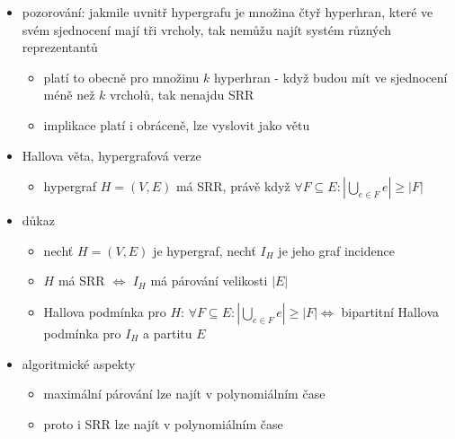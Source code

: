 \begin{itemize}
\begin{itemize}
\begin{itemize}
\begin{itemize}
\end{itemize}
\end{itemize}
\item pozorování: jakmile uvnitř hypergrafu je množina čtyř hyperhran, které ve svém sjednocení mají tři vrcholy, tak nemůžu najít systém různých reprezentantů
\begin{itemize}
\item platí to obecně pro množinu $k$ hyperhran - když budou mít ve sjednocení méně než $k$ vrcholů, tak nenajdu SRR
\item implikace platí i obráceně, lze vyslovit jako větu
\end{itemize}
\item Hallova věta, hypergrafová verze
\begin{itemize}
\item hypergraf $H=(V,E)$ má SRR, právě když $\forall F\subseteq E:\left|\bigcup_{e\in F} e\right|\geq |F|$
\end{itemize}
\item důkaz
\begin{itemize}
\item nechť $H=(V,E)$ je hypergraf, nechť $I_H$ je jeho graf incidence
\item $H$ má SRR $\iff$ $I_H$ má párování velikosti $|E|$
\item Hallova podmínka pro $H$: $\forall F\subseteq E: \left|\bigcup_{e\in F}e\right|\geq |F|\iff$ bipartitní Hallova podmínka pro $I_H$ a partitu $E$
\end{itemize}
\item algoritmické aspekty
\begin{itemize}
\item maximální párování lze najít v polynomiálním čase
\item proto i SRR lze najít v polynomiálním čase
\end{itemize}
\end{itemize}
\end{itemize}
